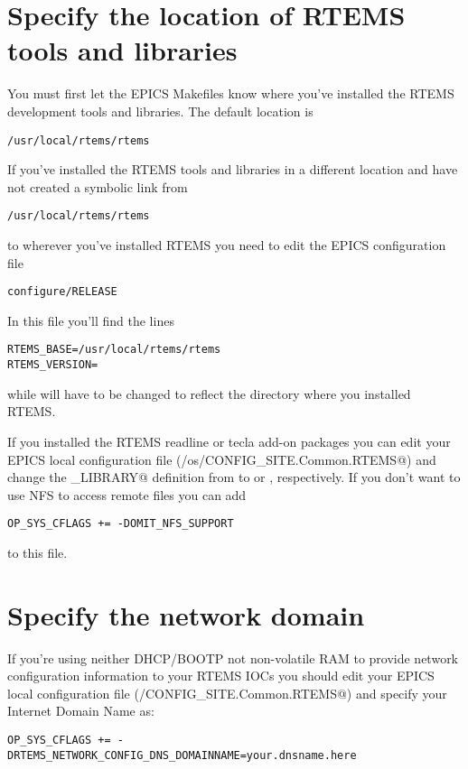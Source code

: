 \documentclass{report}
\begin{document}
\section{Specify the location of RTEMS tools and libraries}
You must first let the EPICS Makefiles know where you've installed
the RTEMS development tools and libraries.  The default location is
\begin{alltt}
/usr/local/rtems/rtems\rtemsVersion
\end{alltt}
If you've installed the RTEMS tools and libraries in a different location and
have not created a symbolic link from
\begin{alltt}
/usr/local/rtems/rtems\rtemsVersion
\end{alltt}
to wherever you've installed RTEMS you need to edit the EPICS configuration
file
\begin{verbatim}
configure/RELEASE
\end{verbatim}
In this file you'll find the lines
\begin{alltt}
RTEMS_BASE=/usr/local/rtems/rtems\rtemsVersion
RTEMS_VERSION=\rtemsVersion
\end{alltt}
while will have to be changed to reflect the directory where you installed RTEMS.

If you installed the RTEMS readline or tecla add-on packages you can edit
your EPICS local configuration file (\verb@configure/os/CONFIG_SITE.Common.RTEMS@)
and change the \verb@EPICSCOMMANDLINE_LIBRARY@ definition from \verb@EPICS@ to
\verb@READLINE@ or \verb@LIBTECLA@, respectively.
If you don't want to use NFS to access remote files you can add
\begin{verbatim}
OP_SYS_CFLAGS += -DOMIT_NFS_SUPPORT
\end{verbatim}
to this file.

\section{Specify the network domain}
If you're using neither DHCP/BOOTP not non-volatile RAM to provide network
configuration information to your RTEMS IOCs you should edit
your EPICS local configuration file (\verb@configure/CONFIG_SITE.Common.RTEMS@)
and specify your Internet Domain Name as:
\begin{verbatim}
OP_SYS_CFLAGS += -DRTEMS_NETWORK_CONFIG_DNS_DOMAINNAME=your.dnsname.here
\end{verbatim}
\end{document}
